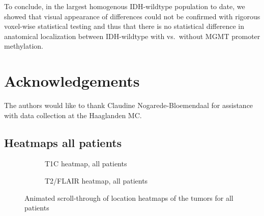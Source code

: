 To conclude, in the largest homogenous \gls{IDH}-wildtype  population to date, we showed that visual appearance of differences could not be confirmed with rigorous voxel-wise statistical testing and thus that there is no statistical difference in anatomical localization between \gls{IDH}-wildtype  with vs.\ without \gls{MGMT} promoter methylation.

\section*{Acknowledgements}

The authors would like to thank Claudine Nogarede-Bloemendaal for assistance with data collection at the Haaglanden MC\@.

\ifdigital
    \newpage
    \begin{subappendices}
        \section{Heatmaps all patients}
        \begin{figure}[H]
            \centering
            \begin{subfigure}[t]{0.4\textwidth}
                \centering
                \caption{\acrshort{T1C} heatmap, all patients}\label{fig:HGG_loc_T1_heatmap_all}
            \end{subfigure}
            \hfill
            \begin{subfigure}[t]{0.4\textwidth}
                \centering
                \caption{\acrshort{T2}/\acrshort{FLAIR} heatmap, all patients}\label{fig:HGG_loc_T2_heatmap_all}
            \end{subfigure}
            \caption{Animated scroll-through of location heatmaps of the \glspl{tumor} for all patients}\label{fig:HGG_local_heatmaps_full_all}
        \end{figure}

        \newpage


\end{subappendices}
